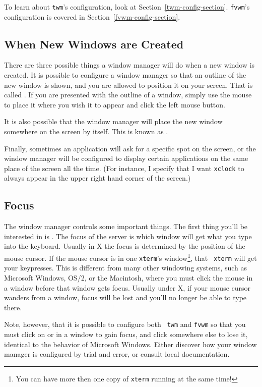 To learn about {\tt twm}'s configuration, look at
Section~\ref{twm-config-section}. {\tt fvwm}'s configuration is
covered in Section~\ref{fvwm-config-section}.

\subsection{When New Windows are Created}

There are three possible things a window manager will do when a new
window is created.  It is possible to configure a window manager so
that an outline of the new window is shown, and you are allowed to
position it on your screen. That is called .
If you are presented with the outline of a window, simply use the
mouse to place it where you wish it to appear and click the left mouse
button.

It is also possible that the window manager will place the new window
somewhere on the screen by itself.  This is known as 
.

Finally, sometimes an application will ask for a specific spot on the
screen, or the window manager will be configured to display certain
applications on the same place of the screen all the time. (For
instance, I specify that I want {\tt xclock} to always appear in
the upper right hand corner of the screen.)

\subsection{Focus}

The window manager controls some important things. The first thing
you'll be interested in is .  The focus of the server is
which window will get what you type into the keyboard. Usually in X
the focus is determined by the position of the mouse cursor.  If the
mouse cursor is in one {\tt xterm}'s window\footnote{You can have more
  then one copy of {\tt xterm} running at the same time!}, that {\tt
  xterm} will get your keypresses.  This is different from many other
windowing systems, such as Microsoft Windows, OS/2, or the Macintosh,
where you must click the mouse in a window before that window gets
focus.  Usually under X, if your mouse cursor wanders from a
window, focus will be lost and you'll no longer be able to type there.

Note, however, that it is possible to configure both {\tt
  twm} and {\tt fvwm} so that you must
click on or in a window to gain focus, and click somewhere else to
lose it, identical to the behavior of Microsoft Windows.  Either
discover how your window manager is configured by trial and error, or
consult local documentation.

